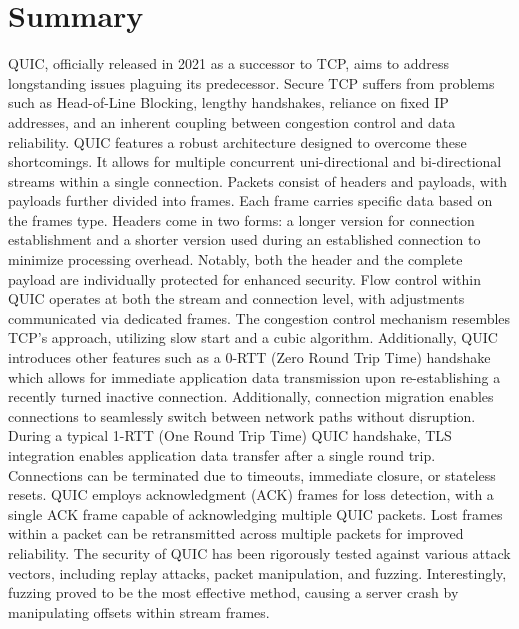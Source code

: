 \chapter{Summary}
QUIC, officially released in 2021 as a successor to TCP, aims to address longstanding issues plaguing its predecessor. Secure TCP
suffers from problems such as Head-of-Line Blocking, lengthy handshakes, reliance on fixed IP addresses, and an inherent coupling
between congestion control and data reliability.
QUIC features a robust architecture designed to overcome these shortcomings. It allows for multiple concurrent uni-directional and
bi-directional streams within a single connection. Packets consist of headers and payloads, with payloads further divided into
frames. Each frame carries specific data based on the frames type. Headers come in two forms: a longer version for connection
establishment and a shorter version used during an established connection to minimize processing overhead. Notably, both the header
and the complete payload are individually protected for enhanced security.
Flow control within QUIC operates at both the stream and connection level, with adjustments communicated via dedicated frames. The
congestion control mechanism resembles TCP's approach, utilizing slow start and a cubic algorithm. Additionally, QUIC introduces
other features such as a 0-RTT (Zero Round Trip Time) handshake which allows for immediate application data transmission upon
re-establishing a recently turned inactive connection. Additionally, connection migration enables connections to seamlessly
switch between network paths without disruption. During a typical 1-RTT (One Round Trip Time) QUIC handshake, TLS integration
enables application data transfer after a single round trip.
Connections can be terminated due to timeouts, immediate closure, or stateless resets. QUIC employs acknowledgment (ACK) frames for
loss detection, with a single ACK frame capable of acknowledging multiple QUIC packets. Lost frames within a packet can be retransmitted
across multiple packets for improved reliability. The security of QUIC has been rigorously tested against various attack vectors,
including replay attacks, packet manipulation, and fuzzing. Interestingly, fuzzing proved to be the most effective method, causing
a server crash by manipulating offsets within stream frames.

